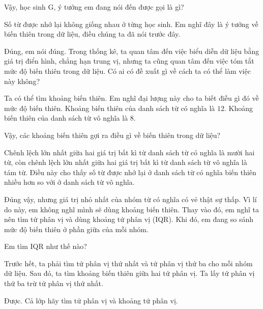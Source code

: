 {\begin{scriptlist}
      \item [Giáo viên:] Vậy, học sinh G, ý tưởng em đang nói đến được gọi là gì?

      \item [Học sinh G:] Số từ được nhớ lại không giống nhau ở từng học sinh. Em nghĩ đây là ý tưởng về biến thiên trong dữ liệu, điều chúng ta đã nói trước đây.

      \item [Giáo viên:] Đúng, em nói đúng. Trong thống kê, ta quan tâm đến việc biểu diễn dữ liệu bằng giá trị điển hình, chẳng hạn trung vị, nhưng ta cũng quan tâm đến việc tóm tắt mức độ biến thiên trong dữ liệu. Có ai có đề xuất gì về cách ta có thể làm việc này không?

      \item [Học sinh H:] Ta có thể tìm khoảng biến thiên. Em nghĩ đại lượng này cho ta biết điều gì đó về mức độ biến thiên. Khoảng biến thiên của danh sách từ có nghĩa là $12$. Khoảng biến thiên của danh sách từ vô nghĩa là $8$.

      \item [Giáo viên:] Vậy, các khoảng biến thiên gợi ra điều gì về biến thiên trong dữ liệu?

      \item [Học sinh H:] Chênh lệch lớn nhất giữa hai giá trị bất kì từ danh sách từ có nghĩa là mười hai từ, còn chênh lệch lớn nhất giữa hai giá trị bất kì từ danh sách từ vô nghĩa là tám từ. Điều này cho thấy số từ được nhớ lại ở danh sách từ có nghĩa biến thiên nhiều hơn so với ở danh sách từ vô nghĩa.\vspace{\baselineskip}

      \item [Học sinh I:] Đúng vậy, nhưng giá trị nhỏ nhất của nhóm từ có nghĩa có vẻ thật sự thấp. Vì lí do này, em không nghĩ mình sẽ dùng khoảng biến thiên. Thay vào đó, em nghĩ ta nên tìm tứ phân vị và dùng khoảng tứ phân vị (IQR). Khi đó, em đang so sánh mức độ biến thiên ở phần giữa của mỗi nhóm.\vspace{\baselineskip}

      \item [Giáo viên:] Em tìm IQR như thế nào?

      \item [Học sinh I:] Trước hết, ta phải tìm tứ phân vị thứ nhất và tứ phân vị thứ ba cho mỗi nhóm dữ liệu. Sau đó, ta tìm khoảng biến thiên giữa hai tứ phân vị. Ta lấy tứ phân vị thứ ba trừ tứ phân vị thứ nhất.

      \item [Giáo viên:] Được. Cả lớp hãy tìm tứ phân vị và khoảng tứ phân vị.\vspace{\baselineskip}


\end{scriptlist}}
